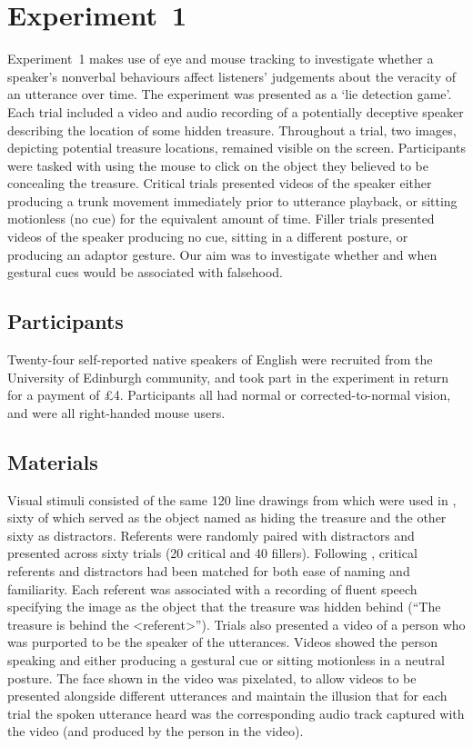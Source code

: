 \documentclass[a4paper,man,natbib]{apa6}
\begin{document}
\section{Experiment~1}
Experiment~1 makes use of eye  and mouse tracking to investigate whether a speaker's nonverbal behaviours affect listeners' judgements about the veracity of an utterance over time. 
The experiment was presented as a `lie detection game'.
Each trial included a video and audio recording of a potentially deceptive speaker describing the location of some hidden treasure.
Throughout a trial, two images, depicting potential treasure locations, remained visible on the screen. 
Participants were tasked with using the mouse to click on the object they believed to be concealing the treasure.
Critical trials presented videos of the speaker either producing a trunk movement immediately prior to utterance playback, or sitting motionless (no cue) for the equivalent amount of time.
Filler trials presented videos of the speaker producing no cue, sitting in a different posture, or producing an adaptor gesture. 
Our aim was to investigate whether and when gestural cues would be associated with falsehood.

\subsection{Participants}
Twenty-four self-reported native speakers of English were recruited from the University of Edinburgh community, and took part in the experiment in return for a payment of \pounds{}4.
Participants all had normal or corrected-to-normal vision, and were all right-handed mouse users.

\subsection{Materials}
Visual stimuli consisted of the same 120 line drawings from \citet{Snodgrass1980} which were used in \citet{Loy2017}, sixty of which served as the object named as hiding the treasure and the other sixty as distractors.
Referents were randomly paired with distractors and presented across sixty trials (20 critical and 40 fillers). 
Following \citet{Loy2017}, critical referents and distractors had been matched for both ease of naming and familiarity.
Each referent was associated with a recording of fluent speech specifying the image as the object that the treasure was hidden behind (``The treasure is behind the <referent>'').
Trials also presented a video of a person who was purported to be the speaker of the utterances. 
Videos showed the person speaking and either producing a gestural cue or sitting motionless in a neutral posture.
The face shown in the video was pixelated, to allow videos to be presented alongside different utterances and maintain the illusion that for each trial the spoken utterance heard was the corresponding audio track captured with the video (and produced by the person in the video).
\end{document}
